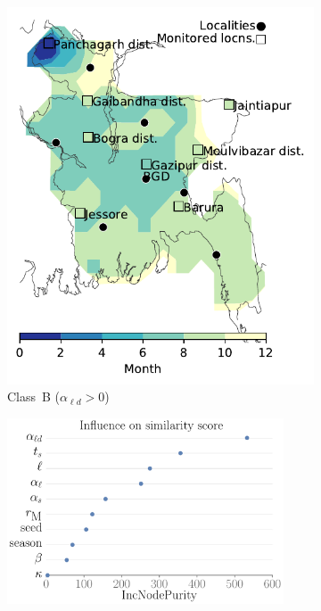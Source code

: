 \documentclass[11pt]{article}
\newcommand{\ald}{\alpha_{\ell d}}
\theoremstyle{definition}
\begin{document}
\begin{figure}[t]
\begin{subfigure}[b]{.3\textwidth}
    \includegraphics[width=\textwidth]{../cellular_automata/results/contour/BGD_model-B_m1_l3.pdf}
    \caption{Class~B ($\ald>0$) \label{fig:bgdClassB1}}
\end{subfigure}
\begin{subfigure}[b]{.32\textwidth}
    \centering
    \includegraphics[width=0.9\textwidth]{../cellular_automata/results/rf/rf_importance_all_mdi.pdf}

\end{subfigure}
\end{figure}
\end{document}
